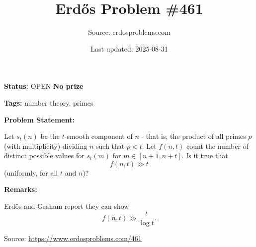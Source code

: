 \documentclass{article}
\title{Erd\H{o}s Problem \#461}
\date{Last updated: 2025-08-31}
\author{Source: erdosproblems.com}
\begin{document}
\maketitle

\noindent\textbf{Status:} OPEN \quad \textbf{No prize}

\noindent\textbf{Tags:} number theory, primes

\medskip
\noindent\textbf{Problem Statement:}

Let $s_t(n)$ be the $t$-smooth component of $n$ - that is, the product of all primes $p$ (with multiplicity) dividing $n$ such that $p<t$. Let $f(n,t)$ count the number of distinct possible values for $s_t(m)$ for $m\in [n+1,n+t]$. Is it true that\[f(n,t)\gg t\](uniformly, for all $t$ and $n$)?

\bigskip
\noindent\textbf{Remarks:}

Erd\H{o}s and Graham report they can show\[f(n,t) \gg \frac{t}{\log t}.\]

\bigskip
\noindent\small{Source: \url{https://www.erdosproblems.com/461}}
\end{document}
